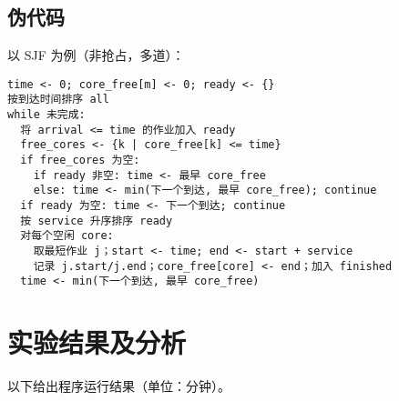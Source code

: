\documentclass[12pt,hyperref,a4paper,UTF8]{ctexart}
\begin{document}
\subsection{伪代码}
以 SJF 为例（非抢占，多道）：
\begin{verbatim}
time <- 0; core_free[m] <- 0; ready <- {}
按到达时间排序 all
while 未完成:
  将 arrival <= time 的作业加入 ready
  free_cores <- {k | core_free[k] <= time}
  if free_cores 为空:
    if ready 非空: time <- 最早 core_free
    else: time <- min(下一个到达, 最早 core_free); continue
  if ready 为空: time <- 下一个到达; continue
  按 service 升序排序 ready
  对每个空闲 core:
    取最短作业 j；start <- time; end <- start + service
    记录 j.start/j.end；core_free[core] <- end；加入 finished
  time <- min(下一个到达, 最早 core_free)
\end{verbatim}

\section{实验结果及分析}
以下给出程序运行结果（单位：分钟）。
\end{document}
